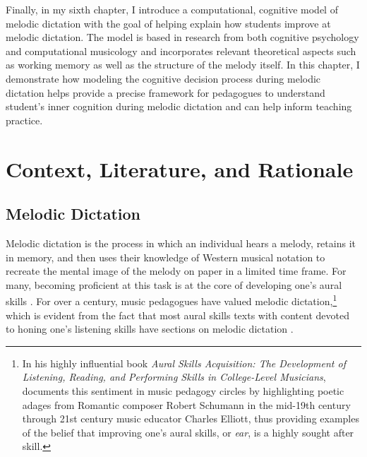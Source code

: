 \documentclass[12pt,]{book}
\let\rmarkdownfootnote\footnote%
\def\footnote{\protect\rmarkdownfootnote}
\begin{document}
Finally, in my sixth chapter, I introduce a computational, cognitive model of melodic dictation with the goal of helping explain how students improve at melodic dictation.
The model is based in research from both cognitive psychology \citep{cowanMagicalMysteryFour2010} and computational musicology \citep{pearceStatisticalLearningProbabilistic2018a} and incorporates relevant theoretical aspects such as working memory \citep{chenetteReframingAuralSkills2019, vanhandelRoleWorkingMemory2011} as well as the structure of the melody itself.
In this chapter, I demonstrate how modeling the cognitive decision process during melodic dictation helps provide a precise framework for pedagogues to understand student's inner cognition during melodic dictation and can help inform teaching practice.

\hypertarget{intro}{%
\chapter{Context, Literature, and Rationale}\label{intro}}

\hypertarget{melodic-dictation}{%
\section{Melodic Dictation}\label{melodic-dictation}}

Melodic dictation is the process in which an individual hears a melody, retains it in memory, and then uses their knowledge of Western musical notation to recreate the mental image of the melody on paper in a limited time frame.
For many, becoming proficient at this task is at the core of developing one's aural skills \citep{karpinskiModelMusicPerception1990}.
For over a century, music pedagogues have valued melodic dictation,\footnote{In his highly influential book \emph{Aural Skills Acquisition: The Development of Listening, Reading, and Performing Skills in College-Level Musicians}, \citet{karpinskiAuralSkillsAcquisition2000} documents this sentiment in music pedagogy circles by highlighting poetic adages from Romantic composer Robert Schumann in the mid-19th century through 21st century music educator Charles Elliott, thus providing examples of the belief that improving one's aural skills, or \emph{ear}, is a highly sought after skill.} which is evident from the fact that most aural skills texts with content devoted to honing one's listening skills have sections on melodic dictation \citep{karpinskiAuralSkillsAcquisition2000}.
\end{document}
